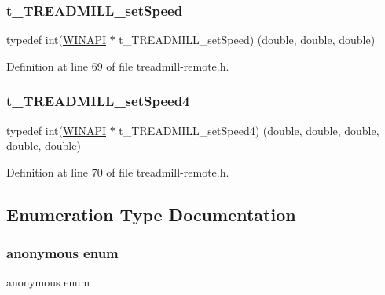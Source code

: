 \subsubsection{\texorpdfstring{t\+\_\+\+T\+R\+E\+A\+D\+M\+I\+L\+L\+\_\+set\+Speed}{t\_TREADMILL\_setSpeed}}
{\footnotesize\ttfamily typedef int(\hyperlink{treadmill-remote_8h_a9aa60e1ead64be77ad551e745cbfd4d3}{W\+I\+N\+A\+PI} $\ast$ t\+\_\+\+T\+R\+E\+A\+D\+M\+I\+L\+L\+\_\+set\+Speed) (double, double, double)}



Definition at line 69 of file treadmill-\/remote.\+h.

\mbox{\label{treadmill-remote_8h_ab6f42b69947e7d9bc7b968152eeadcd6}} 
\subsubsection{\texorpdfstring{t\+\_\+\+T\+R\+E\+A\+D\+M\+I\+L\+L\+\_\+set\+Speed4}{t\_TREADMILL\_setSpeed4}}
{\footnotesize\ttfamily typedef int(\hyperlink{treadmill-remote_8h_a9aa60e1ead64be77ad551e745cbfd4d3}{W\+I\+N\+A\+PI} $\ast$ t\+\_\+\+T\+R\+E\+A\+D\+M\+I\+L\+L\+\_\+set\+Speed4) (double, double, double, double, double)}



Definition at line 70 of file treadmill-\/remote.\+h.



\subsection{Enumeration Type Documentation}
\mbox{\label{treadmill-remote_8h_a4790f45dcc812c1b00184a2edccdddf5}} 
\subsubsection{\texorpdfstring{anonymous enum}{anonymous enum}}
{\footnotesize\ttfamily anonymous enum}

